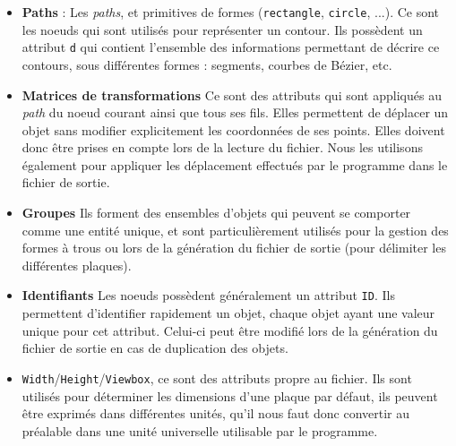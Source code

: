 \begin{itemize}
    \item{\textbf{Paths} : } Les \textit{paths}, et primitives de formes (\texttt{rectangle}, \texttt{circle}, ...). Ce sont les noeuds qui sont utilisés pour représenter un contour. Ils possèdent un attribut \texttt{d} qui contient l'ensemble des informations permettant de décrire ce contours, sous différentes formes : segments, courbes de Bézier, etc.
    \item{\textbf{Matrices de transformations}} Ce sont des attributs qui sont appliqués au \textit{path} du noeud courant ainsi que tous ses fils. Elles permettent de déplacer un objet sans modifier explicitement les coordonnées de ses points. Elles doivent donc être prises en compte lors de la lecture du fichier. Nous les utilisons également pour appliquer les déplacement effectués par le programme dans le fichier de sortie.
    \item{\textbf{Groupes}} Ils forment des ensembles d'objets qui peuvent se comporter comme une entité unique, et sont particulièrement utilisés pour la gestion des formes à trous ou lors de la génération du fichier de sortie (pour délimiter les différentes plaques).
    \item{\textbf{Identifiants}} Les noeuds possèdent généralement un attribut \texttt{ID}. Ils permettent d'identifier rapidement un objet, chaque objet ayant une valeur unique pour cet attribut. Celui-ci peut être modifié lors de la génération du fichier de sortie en cas de duplication des objets.
    \item{\texttt{Width}/\texttt{Height}/\texttt{Viewbox}}, ce sont des attributs propre au fichier. Ils sont utilisés pour déterminer les dimensions d'une plaque par défaut, ils peuvent être exprimés dans différentes unités, qu'il nous faut donc convertir au préalable dans une unité universelle utilisable par le programme.    
\end{itemize}

